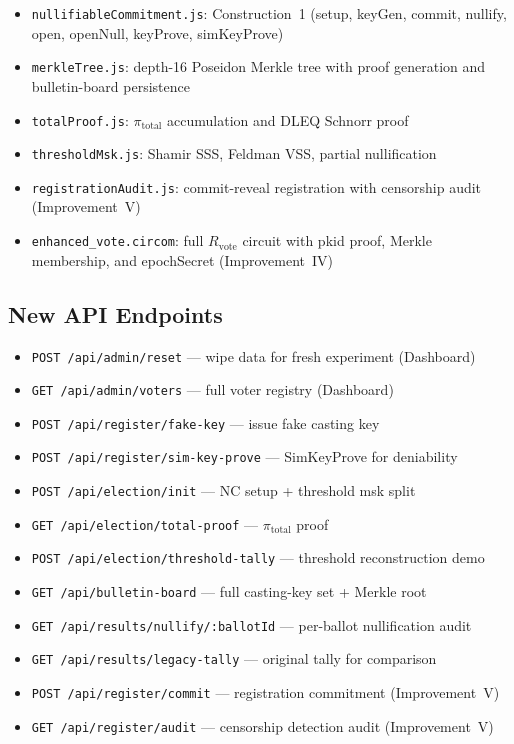 \documentclass[conference]{IEEEtran}
\begin{document}
\begin{itemize}
  \item \texttt{nullifiableCommitment.js}: Construction~1 (setup, keyGen,
    commit, nullify, open, openNull, keyProve, simKeyProve)
  \item \texttt{merkleTree.js}: depth-16 Poseidon Merkle tree with proof
    generation and bulletin-board persistence
  \item \texttt{totalProof.js}: $\pi_{\text{total}}$ accumulation and DLEQ
    Schnorr proof
  \item \texttt{thresholdMsk.js}: Shamir SSS, Feldman VSS, partial nullification
  \item \texttt{registrationAudit.js}: commit-reveal registration with censorship audit (Improvement~V)
  \item \texttt{enhanced\_vote.circom}: full $R_{\text{vote}}$ circuit with
    pkid proof, Merkle membership, and epochSecret (Improvement~IV)
\end{itemize}

\subsection{New API Endpoints}

\begin{itemize}
  \item \texttt{POST /api/admin/reset} --- wipe data for fresh experiment (Dashboard)
  \item \texttt{GET /api/admin/voters} --- full voter registry (Dashboard)
  \item \texttt{POST /api/register/fake-key} --- issue fake casting key
  \item \texttt{POST /api/register/sim-key-prove} --- SimKeyProve for deniability
  \item \texttt{POST /api/election/init} --- NC setup + threshold msk split
  \item \texttt{GET /api/election/total-proof} --- $\pi_{\text{total}}$ proof
  \item \texttt{POST /api/election/threshold-tally} --- threshold reconstruction demo
  \item \texttt{GET /api/bulletin-board} --- full casting-key set + Merkle root
  \item \texttt{GET /api/results/nullify/:ballotId} --- per-ballot nullification audit
  \item \texttt{GET /api/results/legacy-tally} --- original tally for comparison
  \item \texttt{POST /api/register/commit} --- registration commitment (Improvement~V)
  \item \texttt{GET /api/register/audit} --- censorship detection audit (Improvement~V)
\end{itemize}
\end{document}
